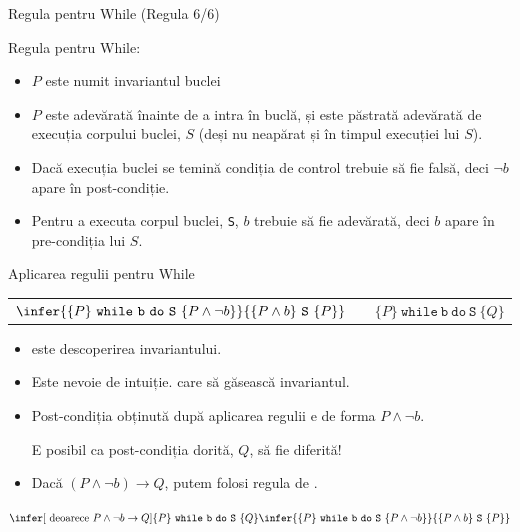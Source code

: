 \begin{frame}{Regula pentru While (Regula 6/6)}

\vspace{-.6cm}
\alert{Regula pentru While:}
\begin{center}
\end{center}

\pause
\begin{itemize}
	\item $P$ este numit \alert{invariantul buclei}
	\item $P$ este adevărată înainte de a intra în buclă, și este păstrată adevărată de execuția corpului buclei, $S$ (deși nu neapărat și în timpul execuției lui $S$).
	\item Dacă execuția buclei se temină condiția de control trebuie să fie falsă, deci $\neg b$ apare în post-condiție.
	\item Pentru a executa corpul buclei, \texttt{S}, $b$ trebuie să fie adevărată, deci $b$ apare în pre-condiția lui $S$.
\end{itemize}
\end{frame}

\begin{frame}{Aplicarea regulii pentru While}

\begin{center}
\begin{tabular}{ccc}
$\infer{\{P\}\ \mathtt{while\ b\ do\ S}\ \{P\wedge \neg b\}}{\{P \wedge b\}\ \mathtt{S}\ \{P\}}$ &&  $\{P\}\ \mathtt{while\ b\ do\ S}\ \{Q\}$
\end{tabular}
\end{center}

\begin{itemize}
	\item {} este descoperirea \alert{invariantului}. 

	\item Este nevoie de \alert{intuiție}.  care să găsească invariantul.

	\item Post-condiția obținută după aplicarea regulii e de forma $P\wedge \neg b$.
	
	 E posibil ca post-condiția dorită, $Q$, să fie diferită! 

	\item Dacă $(P \wedge \neg b) \to Q$, putem folosi regula de .
\end{itemize}

\begin{center}
$
\infer[\mbox{ deoarece }P \wedge \neg b \to Q]{\{P\}\ \mathtt{while\ b\ do\ S}\ \{Q\}}
{
\infer{\{P\}\ \mathtt{while\ b\ do\ S}\ \{P\wedge \neg b\}}{\{P \wedge b\}\ \mathtt{S}\ \{P\}}
}
$
\end{center}
\end{frame}

